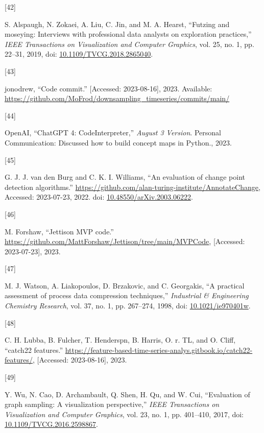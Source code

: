 \documentclass{article}
\newlength{\cslhangindent}
\newlength{\csllabelwidth}
\newlength{\cslentryspacingunit} %
\newenvironment{CSLReferences}[2] %
 {%
  \setlength{\parindent}{0pt}
  \ifodd #1
  \let\oldpar\par
  \def\par{\hangindent=\cslhangindent\oldpar}
  \fi
  \setlength{\parskip}{#2\cslentryspacingunit}
 }%
 {}
\newcommand{\CSLLeftMargin}[1]{\parbox[t]{\csllabelwidth}{#1}}
\newcommand{\CSLRightInline}[1]{\parbox[t]{\linewidth - \csllabelwidth}{#1}\break}
\begin{document}
\begin{CSLReferences}{0}{0}
\leavevmode{}%
\CSLLeftMargin{{[}42{]} }
\CSLRightInline{S. Alspaugh, N. Zokaei, A. Liu, C. Jin, and M. A.
Hearst, {``Futzing and moseying: Interviews with professional data
analysts on exploration practices,''} \emph{IEEE Transactions on
Visualization and Computer Graphics}, vol. 25, no. 1, pp. 22--31, 2019,
doi:
\href{https://doi.org/10.1109/TVCG.2018.2865040}{10.1109/TVCG.2018.2865040}.}

\leavevmode{}%
\CSLLeftMargin{{[}43{]} }
\CSLRightInline{jonodrew, {``Code commit.''} {[}Accessed: 2023-08-16{]},
2023. Available:
\url{https://github.com/MoFrod/downsampling_timeseries/commits/main/}}

\leavevmode{}%
\CSLLeftMargin{{[}44{]} }
\CSLRightInline{OpenAI, {``ChatGPT 4: CodeInterpreter,''} \emph{August 3
Version}. Personal Communication: Discussed how to build concept maps in
Python., 2023.}

\leavevmode{}%
\CSLLeftMargin{{[}45{]} }
\CSLRightInline{G. J. J. van den Burg and C. K. I. Williams, {``An
evaluation of change point detection algorithms.''}
\url{https://github.com/alan-turing-institute/AnnotateChange}, Accessed:
2023-07-23, 2022. doi:
\href{https://doi.org/10.48550/arXiv.2003.06222}{10.48550/arXiv.2003.06222}.}

\leavevmode{}%
\CSLLeftMargin{{[}46{]} }
\CSLRightInline{M. Forshaw, {``Jettison MVP code.''}
\url{https://github.com/MattForshaw/Jettison/tree/main/MVPCode},
{[}Accessed: 2023-07-23{]}, 2023.}

\leavevmode{}%
\CSLLeftMargin{{[}47{]} }
\CSLRightInline{M. J. Watson, A. Liakopoulos, D. Brzakovic, and C.
Georgakis, {``A practical assessment of process data compression
techniques,''} \emph{Industrial \& Engineering Chemistry Research}, vol.
37, no. 1, pp. 267--274, 1998, doi:
\href{https://doi.org/10.1021/ie970401w}{10.1021/ie970401w}.}

\leavevmode{}%
\CSLLeftMargin{{[}48{]} }
\CSLRightInline{C. H. Lubba, B. Fulcher, T. Henderspn, B. Harris, O. r.
TL, and O. Cliff, {``catch22 features.''}
\url{https://feature-based-time-series-analys.gitbook.io/catch22-features/},
{[}Accessed: 2023-08-16{]}, 2023.}

\leavevmode{}%
\CSLLeftMargin{{[}49{]} }
\CSLRightInline{Y. Wu, N. Cao, D. Archambault, Q. Shen, H. Qu, and W.
Cui, {``Evaluation of graph sampling: A visualization perspective,''}
\emph{IEEE Transactions on Visualization and Computer Graphics}, vol.
23, no. 1, pp. 401--410, 2017, doi:
\href{https://doi.org/10.1109/TVCG.2016.2598867}{10.1109/TVCG.2016.2598867}.}

\end{CSLReferences}



\end{document}
